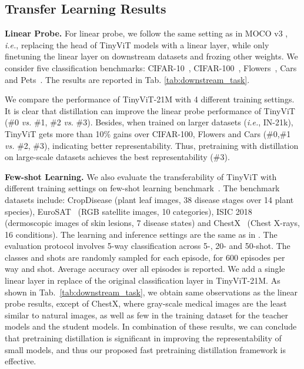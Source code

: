 \documentclass[runningheads]{llncs}
\newcommand\REV[1]{#1}
\begin{document}
\vspace{-3mm}
\subsection{Transfer Learning Results}

\quad\quad\textbf{Linear Probe.} For linear probe, we follow the same setting as in MOCO v3 \cite{mocov3}, \emph{i.e.}, replacing the head of TinyViT models with a linear layer, while only finetuning the linear layer on downstream datasets and frozing other weights. We consider five classification benchmarks: CIFAR-10~\cite{cifar}, CIFAR-100~\cite{cifar}, Flowers~\cite{flowers}, Cars~\cite{stanford_cars} and Pets~\cite{pet}. The results are reported in Tab. \ref{tab:downstream_task}. 

We compare the performance of TinyViT-21M with 4 different training settings. It is clear that distillation can improve the linear probe performance of TinyViT (\#0 \emph{vs.} \#1, \#2 \emph{vs.} \#3). Besides, when trained on larger datasets (\emph{i.e.}, IN-21k), TinyViT gets more than 10\% gains over CIFAR-100, Flowers and Cars (\#0,\#1 \emph{vs.} \#2, \#3), indicating better representability. Thus, pretraining with distillation on large-scale datasets achieves the best representability (\#3).


\textbf{Few-shot Learning.}
We also evaluate the transferability of TinyViT with different training settings on few-shot learning benchmark~\cite{fewshot}. 
The benchmark datasets include: \REV{CropDisease \cite{cropdisease} (plant leaf images, 38 disease stages over 14 plant species), EuroSAT~\cite{eurosat} (RGB satellite images, 10 categories), ISIC 2018~\cite{isic} (dermoscopic images of skin lesions, 7 disease states) and ChestX~\cite{chestx} (Chest X-rays, 16 conditions). The learning and inference settings are the same as in \cite{fewshot}. The evaluation protocol involves 5-way classification across 5-, 20- and 50-shot. The classes and shots are randomly sampled for each episode, for 600 episodes per way and shot. Average accuracy over all episodes is reported. We add a single linear layer in replace of the original classification layer in TinyViT-21M. 
As shown in Tab.~\ref{tab:downstream_task},
we obtain same observations as the linear probe results, except of ChestX, where gray-scale medical images are the least similar to natural images, as well as few in the training dataset for the teacher models and the student models.}
In combination of these results, we can conclude that pretraining distillation is significant in improving the representability of small models, and thus our proposed fast pretraining distillation framework is effective.
\end{document}
